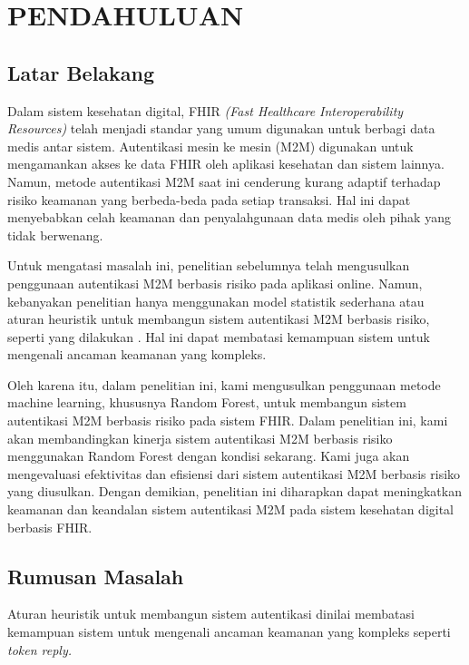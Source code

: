\chapter{PENDAHULUAN}

\section{Latar Belakang}

Dalam sistem kesehatan digital, FHIR \textit{(Fast Healthcare Interoperability
Resources)} telah menjadi standar yang umum digunakan untuk berbagi data medis
antar sistem. Autentikasi mesin ke mesin (M2M) digunakan untuk mengamankan
akses ke data FHIR oleh aplikasi kesehatan dan sistem lainnya. Namun, metode
autentikasi M2M saat ini cenderung kurang adaptif terhadap risiko keamanan yang
berbeda-beda pada setiap transaksi. Hal ini dapat menyebabkan celah keamanan
dan penyalahgunaan data medis oleh pihak yang tidak berwenang.

Untuk mengatasi masalah ini, penelitian sebelumnya telah mengusulkan
penggunaan autentikasi M2M berbasis risiko pada aplikasi online. Namun,
kebanyakan penelitian hanya menggunakan model statistik sederhana atau aturan
heuristik untuk membangun sistem autentikasi M2M berbasis risiko, seperti yang
dilakukan \cite{arbelaitz2012enhancing}. 
Hal ini dapat membatasi kemampuan sistem untuk mengenali ancaman keamanan yang kompleks.

Oleh karena itu, dalam penelitian ini, kami mengusulkan penggunaan metode
machine learning, khususnya Random Forest, untuk membangun sistem autentikasi
M2M berbasis risiko pada sistem FHIR. Dalam penelitian ini, kami akan
membandingkan kinerja sistem autentikasi M2M berbasis risiko menggunakan
Random Forest dengan kondisi sekarang. Kami juga akan mengevaluasi efektivitas
dan efisiensi dari sistem autentikasi M2M berbasis risiko yang diusulkan. Dengan
demikian, penelitian ini diharapkan dapat meningkatkan keamanan dan keandalan
sistem autentikasi M2M pada sistem kesehatan digital berbasis FHIR.


\section{Rumusan Masalah}

Aturan heuristik untuk membangun sistem autentikasi dinilai membatasi
kemampuan sistem untuk mengenali ancaman keamanan yang kompleks seperti \textit{token reply.}


